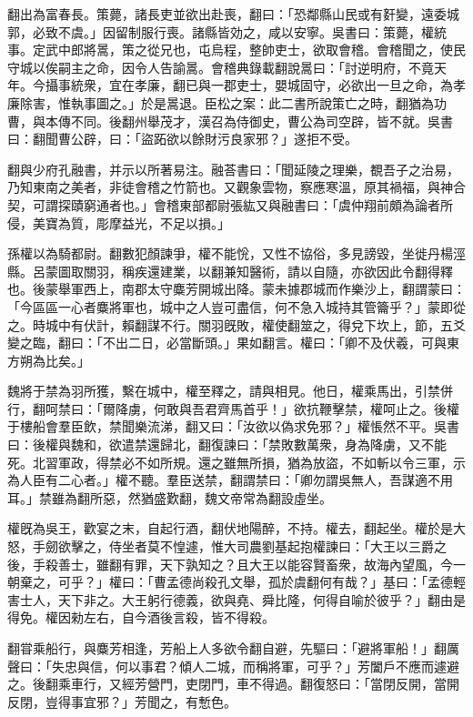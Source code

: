 \begin{pinyinscope}
翻出為富春長。策薨，諸長吏並欲出赴喪，翻曰：「恐鄰縣山民或有姧變，遠委城郭，必致不虞。」因留制服行喪。諸縣皆効之，咸以安寧。吳書曰：策薨，權統事。定武中郎將暠，策之從兄也，屯烏程，整帥吏士，欲取會稽。會稽聞之，使民守城以俟嗣主之命，因令人告諭暠。會稽典錄載翻說暠曰：「討逆明府，不竟天年。今攝事統衆，宜在孝廉，翻已與一郡吏士，嬰城固守，必欲出一旦之命，為孝廉除害，惟執事圖之。」於是暠退。臣松之案：此二書所說策亡之時，翻猶為功曹，與本傳不同。後翻州舉茂才，漢召為侍御史，曹公為司空辟，皆不就。吳書曰：翻聞曹公辟，曰：「盜跖欲以餘財污良家邪？」遂拒不受。

翻與少府孔融書，并示以所著易注。融荅書曰：「聞延陵之理樂，覩吾子之治易，乃知東南之美者，非徒會稽之竹箭也。又觀象雲物，察應寒溫，原其禍福，與神合契，可謂探賾窮通者也。」會稽東部都尉張紘又與融書曰：「虞仲翔前頗為論者所侵，美寶為質，彫摩益光，不足以損。」

孫權以為騎都尉。翻數犯顏諫爭，權不能恱，又性不協俗，多見謗毀，坐徙丹楊涇縣。呂蒙圖取關羽，稱疾還建業，以翻兼知醫術，請以自隨，亦欲因此令翻得釋也。後蒙舉軍西上，南郡太守麋芳開城出降。蒙未據郡城而作樂沙上，翻謂蒙曰：「今區區一心者麋將軍也，城中之人豈可盡信，何不急入城持其管籥乎？」蒙即從之。時城中有伏計，賴翻謀不行。關羽旣敗，權使翻筮之，得兌下坎上，節，五爻變之臨，翻曰：「不出二日，必當斷頭。」果如翻言。權曰：「卿不及伏羲，可與東方朔為比矣。」

魏將于禁為羽所獲，繫在城中，權至釋之，請與相見。他日，權乘馬出，引禁併行，翻呵禁曰：「爾降虜，何敢與吾君齊馬首乎！」欲抗鞭擊禁，權呵止之。後權于樓船會羣臣飲，禁聞樂流涕，翻又曰：「汝欲以偽求免邪？」權悵然不平。吳書曰：後權與魏和，欲遣禁還歸北，翻復諫曰：「禁敗數萬衆，身為降虜，又不能死。北習軍政，得禁必不如所規。還之雖無所損，猶為放盜，不如斬以令三軍，示為人臣有二心者。」權不聽。羣臣送禁，翻謂禁曰：「卿勿謂吳無人，吾謀適不用耳。」禁雖為翻所惡，然猶盛歎翻，魏文帝常為翻設虛坐。

權旣為吳王，歡宴之末，自起行酒，翻伏地陽醉，不持。權去，翻起坐。權於是大怒，手劒欲擊之，侍坐者莫不惶遽，惟大司農劉基起抱權諫曰：「大王以三爵之後，手殺善士，雖翻有罪，天下孰知之？且大王以能容賢畜衆，故海內望風，今一朝棄之，可乎？」權曰：「曹孟德尚殺孔文舉，孤於虞翻何有哉？」基曰：「孟德輕害士人，天下非之。大王躬行德義，欲與堯、舜比隆，何得自喻於彼乎？」翻由是得免。權因勑左右，自今酒後言殺，皆不得殺。

翻甞乘船行，與麋芳相逢，芳船上人多欲令翻自避，先驅曰：「避將軍船！」翻厲聲曰：「失忠與信，何以事君？傾人二城，而稱將軍，可乎？」芳闔戶不應而遽避之。後翻乘車行，又經芳營門，吏閉門，車不得過。翻復怒曰：「當閉反開，當開反閉，豈得事宜邪？」芳聞之，有慙色。


\end{pinyinscope}

